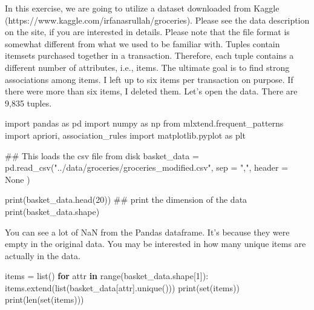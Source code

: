 \documentclass[
  letterpaper,
]{scrbook}
\newenvironment{Shaded}{\begin{snugshade}}{\end{snugshade}}
\newcommand{\BuiltInTok}[1]{\textcolor[rgb]{0.00,0.23,0.31}{#1}}
\newcommand{\CommentTok}[1]{\textcolor[rgb]{0.37,0.37,0.37}{#1}}
\newcommand{\ControlFlowTok}[1]{\textcolor[rgb]{0.00,0.23,0.31}{\textbf{#1}}}
\newcommand{\DecValTok}[1]{\textcolor[rgb]{0.68,0.00,0.00}{#1}}
\newcommand{\ImportTok}[1]{\textcolor[rgb]{0.00,0.46,0.62}{#1}}
\newcommand{\KeywordTok}[1]{\textcolor[rgb]{0.00,0.23,0.31}{\textbf{#1}}}
\newcommand{\NormalTok}[1]{\textcolor[rgb]{0.00,0.23,0.31}{#1}}
\newcommand{\OperatorTok}[1]{\textcolor[rgb]{0.37,0.37,0.37}{#1}}
\newcommand{\StringTok}[1]{\textcolor[rgb]{0.13,0.47,0.30}{#1}}
\newcommand{\VariableTok}[1]{\textcolor[rgb]{0.07,0.07,0.07}{#1}}
\begin{document}
In this exercise, we are going to utilize a dataset downloaded from
Kaggle (https://www.kaggle.com/irfanasrullah/groceries). Please see the
data description on the site, if you are interested in details. Please
note that the file format is somewhat different from what we used to be
familiar with. Tuples contain itemsets purchased together in a
transaction. Therefore, each tuple contains a different number of
attributes, i.e., items. The ultimate goal is to find strong
associations among items. I left up to six items per transaction on
purpose. If there were more than six items, I deleted them. Let's open
the data. There are 9,835 tuples.

\begin{Shaded}
\begin{Highlighting}[]
\ImportTok{import}\NormalTok{ pandas }\ImportTok{as}\NormalTok{ pd}
\ImportTok{import}\NormalTok{ numpy }\ImportTok{as}\NormalTok{ np}
\ImportTok{from}\NormalTok{ mlxtend.frequent\_patterns }\ImportTok{import}\NormalTok{ apriori, association\_rules}
\ImportTok{import}\NormalTok{ matplotlib.pyplot }\ImportTok{as}\NormalTok{ plt}

\CommentTok{\#\# This loads the csv file from disk}
\NormalTok{basket\_data }\OperatorTok{=}\NormalTok{ pd.read\_csv(}\StringTok{"../data/groceries/groceries\_modified.csv"}\NormalTok{, sep }\OperatorTok{=} \StringTok{","}\NormalTok{, header }\OperatorTok{=} \VariableTok{None}\NormalTok{ )}

\BuiltInTok{print}\NormalTok{(basket\_data.head(}\DecValTok{20}\NormalTok{))}
\CommentTok{\#\# print the dimension of the data}
\BuiltInTok{print}\NormalTok{(basket\_data.shape)}
\end{Highlighting}
\end{Shaded}

You can see a lot of NaN from the Pandas dataframe. It's because they
were empty in the original data. You may be interested in how many
unique items are actually in the data.

\begin{Shaded}
\begin{Highlighting}[]
\NormalTok{items }\OperatorTok{=} \BuiltInTok{list}\NormalTok{()}
\ControlFlowTok{for}\NormalTok{ attr }\KeywordTok{in} \BuiltInTok{range}\NormalTok{(basket\_data.shape[}\DecValTok{1}\NormalTok{]):}
\NormalTok{    items.extend(}\BuiltInTok{list}\NormalTok{(basket\_data[attr].unique()))}
\BuiltInTok{print}\NormalTok{(}\BuiltInTok{set}\NormalTok{(items))}
\BuiltInTok{print}\NormalTok{(}\BuiltInTok{len}\NormalTok{(}\BuiltInTok{set}\NormalTok{(items)))}
\end{Highlighting}
\end{Shaded}
\end{document}
